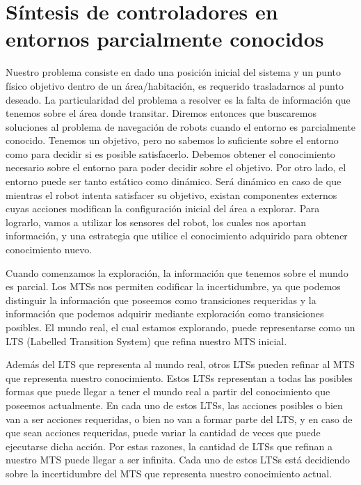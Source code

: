 \chapter{Síntesis de controladores en entornos parcialmente conocidos}

Nuestro problema consiste en dado una posición inicial del sistema y un punto 
físico objetivo dentro de un área/habitación, es requerido trasladarnos al 
punto deseado. La particularidad del problema a resolver es la falta de 
información que tenemos sobre el área donde transitar. Diremos entonces que 
buscaremos soluciones al problema de navegación de robots cuando el entorno es 
parcialmente conocido.
Tenemos un objetivo, pero no sabemos lo suficiente sobre el entorno como para 
decidir si es 
posible satisfacerlo. Debemos obtener el conocimiento necesario sobre el 
entorno para poder decidir sobre el objetivo. 
Por otro lado, el entorno puede ser tanto estático como dinámico. Será dinámico 
en caso de que mientras el robot intenta satisfacer su objetivo, existan 
componentes externos cuyas acciones modifican la configuración inicial del área 
a explorar.
Para lograrlo, vamos a utilizar los sensores del robot, los cuales nos aportan 
información, y una estrategia que 
utilice el conocimiento adquirido para obtener conocimiento nuevo.

Cuando comenzamos la exploración, la información que tenemos sobre el mundo es 
parcial. Los MTSs nos permiten codificar
la incertidumbre, ya que podemos distinguir la información que poseemos como 
transiciones requeridas y la información
que podemos adquirir mediante exploración como transiciones posibles. El mundo 
real, el cual estamos explorando, puede 
representarse como un LTS (Labelled Transition System) que refina nuestro MTS 
inicial.

Además del LTS que representa al mundo real, otros LTSs pueden refinar al MTS 
que representa nuestro conocimiento. Estos
LTSs representan a todas las posibles formas que puede llegar a tener el mundo 
real a partir del conocimiento que poseemos
actualmente. En cada uno de estos LTSs, las acciones posibles o bien van a ser 
acciones requeridas, o bien no van a formar
parte del LTS, y en caso de que sean acciones requeridas, puede variar la 
cantidad de veces que puede ejecutarse dicha acción.
Por estas razones, la cantidad de LTSs que refinan a nuestro MTS puede llegar a 
ser infinita. Cada uno de estos LTSs está
decidiendo sobre la incertidumbre del MTS que representa nuestro conocimiento 
actual.

